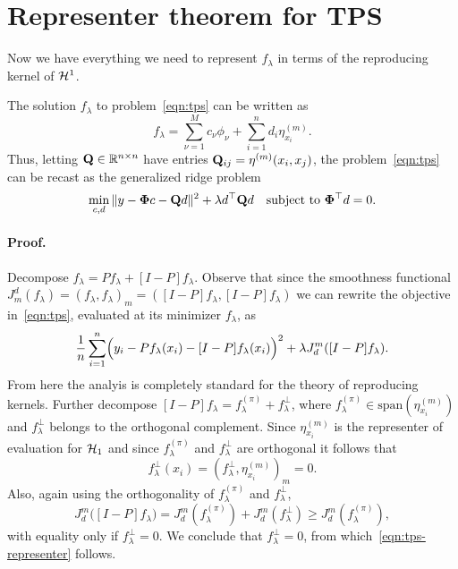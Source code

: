 \documentclass{article}
\begin{document}
\section{Representer theorem for TPS}
Now we have everything we need to represent $f_{\lambda}$ in terms of the reproducing kernel of $\mathcal{H}^{1}$. 
\begin{proposition}
	\label{prop:tps-representer}
	The solution $f_{\lambda}$ to problem~\eqref{eqn:tps} can be written as
	\begin{equation}
	\label{eqn:tps-representer}
		f_{\lambda} = \sum_{\nu = 1}^{M} c_{\nu} \phi_{\nu} + \sum_{i = 1}^{n} d_i \eta^{(m)}_{x_i}.
	\end{equation}
	Thus, letting ${\bf Q} \in \mathbb{R}^{n \times n}$ have entries ${\bf Q}_{ij} = \eta^{(m)}(x_i,x_j)$, the problem~\eqref{eqn:tps} can be recast as the generalized ridge problem
	\begin{equation}
		\label{eqn:generalized-ridge}
		\min_{c,d} \|y - {\bf \Phi} c - {\bf Q} d\|^2 + \lambda d^{\top} {\bf Q} d \quad \textrm{subject to ${\bf \Phi}^{\top}d = 0$.}
	\end{equation}
\end{proposition}

\paragraph{Proof.}
Decompose $f_{\lambda} = Pf_{\lambda} + [I - P]f_{\lambda}$. Observe that since the smoothness functional $J_m^d(f_{\lambda}) = (f_{\lambda},f_{\lambda})_m = ([I - P]f_{\lambda}, [I - P]f_{\lambda})$ we can rewrite the objective in~\eqref{eqn:tps}, evaluated at its minimizer $f_{\lambda}$, as
\begin{equation*}
	\frac{1}{n}\sum_{i = 1}^{n}\Bigl(y_i - Pf_{\lambda}(x_i) - [I - P]f_{\lambda}(x_i)\Bigr)^2 + \lambda J_d^{m}([I - P]f_{\lambda}).
\end{equation*}
From here the analyis is completely standard for the theory of reproducing kernels. Further decompose $[I - P]f_{\lambda} = f_{\lambda}^{(\pi)} + f_{\lambda}^{\perp}$, where $f_{\lambda}^{(\pi)} \in \mathrm{span}(\eta_{x_i}^{(m)})$ and $f_{\lambda}^{\perp}$ belongs to the orthogonal complement. Since $\eta_{x_i}^{(m)}$ is the representer of evaluation for $\mathcal{H}_1$ and since $f_{\lambda}^{(\pi)}$ and $f_{\lambda}^{\perp}$ are orthogonal it follows that 
$$f_{\lambda}^{\perp}(x_i) = (f_{\lambda}^{\perp}, \eta_{x_i}^{(m)})_m = 0.$$ 
Also, again using the orthogonality of $f_{\lambda}^{(\pi)}$ and $f_{\lambda}^{\perp}$,
$$J_d^{m}\bigl([I - P]f_{\lambda}\bigr) = J_d^{m}(f_\lambda^{(\pi)}) + J_d^{m}(f_\lambda^{\perp}) \geq J_d^{m}(f_\lambda^{(\pi)}),$$ with equality only if $f_\lambda^{\perp} = 0$. We conclude that $f_{\lambda}^{\perp} = 0$, from which~\eqref{eqn:tps-representer} follows. 
\end{document}
